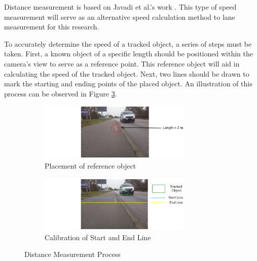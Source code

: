 Distance measurement is based on Javadi et al.'s work \cite{Javadi2019}. This type of speed measurement will serve as an alternative speed calculation method to lane measurement for this research.

To accurately determine the speed of a tracked object, a series of steps must be taken. First, a known object of a specific length should be positioned within the camera's view to serve as a reference point. This reference object will aid in calculating the speed of the tracked object. Next, two lines should be drawn to mark the starting and ending points of the placed object. An illustration of this process can be observed in Figure \ref{fig:distance_measurement_process}.

\begin{figure}[ht!]
    \centering
    \begin{subfigure}[c]{0.8\textwidth}
        \begin{minipage}{\textwidth}
            \centering
            \includegraphics[width=0.8\textwidth]{texs/Part2/chapter4/image/dist1.png}
        \end{minipage}
        \caption{Placement of reference object}
        \label{fig:dist_placement}
    \end{subfigure}
    \begin{subfigure}[c]{0.8\textwidth}
        \begin{minipage}{\textwidth}
            \centering
            \includegraphics[width=0.8\textwidth]{texs/Part2/chapter4/image/dist2.png}
        \end{minipage}
        \caption{Calibration of Start and End Line}
        \label{fig:dist_calibration}
    \end{subfigure}
    \caption{Distance Measurement Process}
    \label{fig:distance_measurement_process}
\end{figure}

